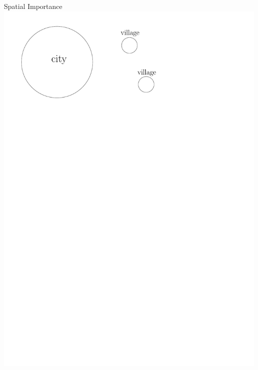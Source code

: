 \documentclass[30pt]{beamer}
\begin{document}
\begin{frame}{Spatial Importance}
\includegraphics[width=\textwidth]{cities}
\end{frame}
\end{document}
